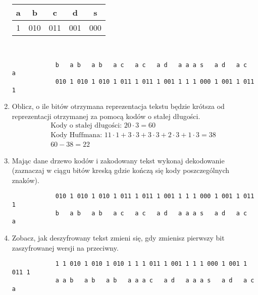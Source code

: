 \documentclass{article}
\begin{document}
\begin{enumerate}[label=(\alph*)]
          \begin{center}
              \begin{tabular}{|c|c|c|c|c|}
                  \hline
                  a & b   & c   & d   & s   \\
                  \hline
                  1 & 010 & 011 & 001 & 000 \\
                  \hline
              \end{tabular} \\[1em]
              \begin{lstlisting}
            b   a b   a b   a c   a c   a d   a a a s   a d   a c   a
            010 1 010 1 010 1 011 1 011 1 001 1 1 1 000 1 001 1 011 1
              \end{lstlisting}
          \end{center}
    \item Oblicz, o ile bitów otrzymana reprezentacja tekstu będzie krótsza od reprezentacji
          otrzymanej za pomocą kodów o stałej długości.
          \begin{gather*}
              \text{Kody o stałej długości: } 20 \cdot 3 = 60 \\
              \text{Kody Huffmana: } 11 \cdot 1 + 3 \cdot 3 + 3 \cdot 3 + 2 \cdot 3 + 1 \cdot 3 = 38 \\
              60 - 38 = 22
          \end{gather*}
    \item Mając dane drzewo kodów i zakodowany tekst wykonaj dekodowanie (zaznaczaj w
          ciągu bitów kreską gdzie kończą się kody poszczególnych znaków).
          \begin{lstlisting}
            010 1 010 1 010 1 011 1 011 1 001 1 1 1 000 1 001 1 011 1
            b   a b   a b   a c   a c   a d   a a a s   a d   a c   a
          \end{lstlisting}
    \item Zobacz, jak deszyfrowany tekst zmieni się, gdy zmienisz pierwszy bit zaszyfrowanej
          wersji na przeciwny.
          \begin{lstlisting}
            1 1 010 1 010 1 010 1 1 1 011 1 001 1 1 1 000 1 001 1 011 1
            a a b   a b   a b   a a a c   a d   a a a s   a d   a c   a
          \end{lstlisting}
\end{enumerate}
\end{document}
